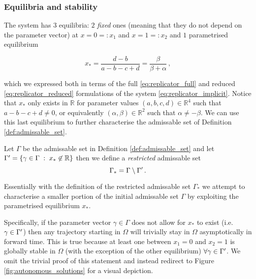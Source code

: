 \documentclass[../main.tex]{subfiles}
\begin{document}
\subsubsection{Equilibria and stability}\label{subsubsec:equilibria}

The system has $3$ equilibria: $2$ \textit{fixed} ones (meaning that they do not depend on the parameter vector) at $x=0=:x_{1}$ and $x=1=:x_{2}$ and $1$ parametrised equilibrium 

\begin{equation}\label{eq:unstable_eq}
     x_{*} = \frac{d-b}{a-b-c+d} = \frac{\beta}{\beta + \alpha}\,,
\end{equation}

which we expressed both in terms of the full \eqref{eq:replicator_full} and reduced \eqref{eq:replicator_reduced} formulations of the system \eqref{eq:replicator_implicit}.
Notice that $x_{*}$ only exists in $\mathbb{R}$ for parameter values $(a,b,c,d)\in \mathbb{R}^{4}$ such that $a - b - c + d \neq 0$, or equivalently $(\alpha,\beta)\in \mathbb{R}^{2}$ such that $\alpha\neq-\beta$.
We can use this last equilibrium to further characterise the admissable set of Definition \ref{def:admissable_set}.

\begin{definition}[]\label{def:restricted_admissable_set}
        Let $\Gamma$ be the admissable set in Definition \ref{def:admissable_set} and let $\Gamma' = \{\gamma\in\Gamma \;:\; x_{*}\not\in\mathbb{R}\}$ then we define a \textit{restricted} admissable set
        \begin{equation*}
                \Gamma_{*} = \Gamma\setminus\Gamma'\,. 
        \end{equation*}
\end{definition}

Essentially with the definition of the restricted admissable set $\Gamma_{*}$ we attempt to characterise a smaller portion of the initial admissable set $\Gamma$ by exploiting the parametrised equilibrium $x_{*}$.


Specifically, if the parameter vector $\gamma\in\Gamma$ does not allow for $x_{*}$ to exist (i.e. $\gamma\in \Gamma'$) then any trajectory starting in $\Omega$ will trivially stay in $\Omega$  asymptotically in forward time.
This is true because at least one between $x_{1} = 0$ and $x_{2} = 1$ is globally stable in $\Omega$ (with the exception of the other equilibrium) $\forall\gamma\in\Gamma'$.
We omit the trivial proof of this statement and instead redirect to Figure \ref{fig:autonomous_solutions} for a visual depiction.
\end{document}
